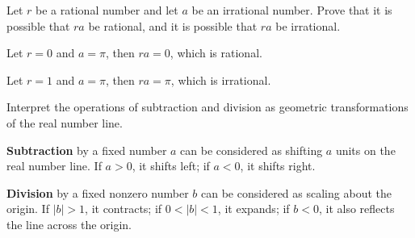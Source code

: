 \begin{exercise}
Let $r$ be a rational number and let $a$ be an irrational number. Prove that it is possible that $ra$ be rational, and it is possible that $ra$ be irrational.
\end{exercise}

\begin{solutions*}
  Let $r = 0$ and $a = \pi$, then $ra = 0$, which is rational.

  Let $r = 1$ and $a = \pi$, then $ra = \pi$, which is irrational.
\end{solutions*}

\begin{exercise}
Interpret the operations of subtraction and division as geometric transformations of the real number line.
\end{exercise}

\begin{solutions*}
\textbf{Subtraction} by a fixed number $a$ can be considered as shifting $a$ units on the real number line. If $a>0$, it shifts left; if $a<0$, it shifts right.

\textbf{Division} by a fixed nonzero number $b$ can be considered as scaling about the origin. If $|b|>1$, it contracts; if $0<|b|<1$, it expands; if $b<0$, it also reflects the line across the origin.
\end{solutions*}